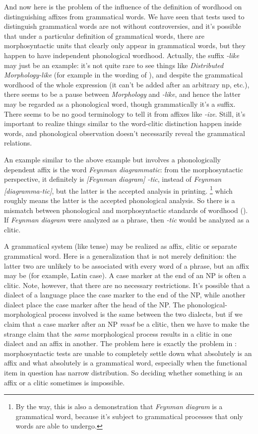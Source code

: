 \documentclass[UTF8, a4paper, oneside, scheme=plain]{ctexart}
\newcommand*{\corpus}[1]{\emph{#1}}
\begin{document}
And now here is the problem of the influence of 
the definition of wordhood on distinguishing affixes from grammatical words.
We have seen that tests used to distinguish grammatical words are not without controversies,
and it's possible that under a particular definition of grammatical words,
there are morphosyntactic units that clearly only appear in grammatical words,
but they happen to have independent phonological wordhood.
Actually, the suffix \corpus{-like} may just be an example:
it's not quite rare to see things like \corpus{Distributed Morphology-like} 
(for example in the wording of \citet{baker2010two}),
and despite the grammatical wordhood of the whole expression
(it can't be added after an arbitrary \ac{np}, etc.),
there seems to be a pause between \corpus{Morphology} and \corpus{-like},
and hence the latter may be regarded as a phonological word,
though grammatically it's a suffix.
There seems to be no good terminology to tell it from affixes like \corpus{-ize}.
Still, it's important to realize things similar to the word-clitic distinction happen inside words,
and phonological observation doesn't necessarily reveal the grammatical relations.

An example similar to the above example but involves a phonologically dependent affix 
is the word \corpus{Feynman diagrammatic}:
from the morphosyntactic perspective, 
it definitely is \corpus{[Feynman diagram] -tic},
instead of \corpus{Feynman [diagramma-tic]},
but the latter is the accepted analysis in printing.%
\footnote{
    By the way, this is also a demonstration that \corpus{Feynman diagram}
    is a grammatical word,
    because it's subject to grammatical processes that only words are able to undergo.
}
which roughly means the latter is the accepted phonological analysis.
So there is a mismatch between phonological and morphosyntactic standards of wordhood 
().
If \corpus{Feynman diagram} were analyzed as a phrase,
then \corpus{-tic} would be analyzed as a clitic.

A grammatical system (like tense) may be realized as affix, clitic or separate grammatical word. 
Here is a generalization that is not merely definition:
the latter two are unlikely to be associated with every word of a phrase, 
but an affix may be (for example, Latin case). 
A case marker at the end of an NP is often a clitic. 
Note, however, that there are no necessary restrictions. 
It's possible that a dialect of a language place the case marker to the end of the NP, 
while another dialect place the case marker after the head of the NP. 
The phonological-morphological process involved is the same between the two dialects, 
but if we claim that a case marker after an NP \emph{must} be a clitic, 
then we have to make the strange claim that 
the \emph{same} morphological process results in a clitic in one dialect and an affix in another.
The problem here is exactly the problem in :
morphosyntactic tests are unable to completely settle down 
what absolutely is an affix and what absolutely is a grammatical word,
especially when the functional item in question has narrow distribution.
So deciding whether something is an affix or a clitic sometimes is impossible.
\end{document}
